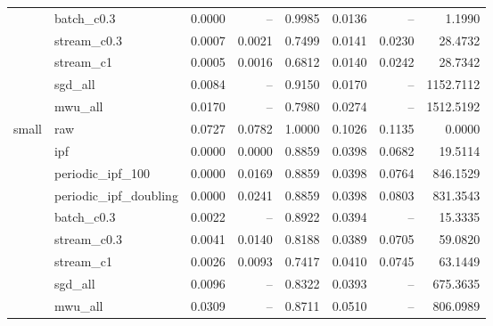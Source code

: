 \begin{tabular}{llrrrrrr}
 & batch\_c0.3 & 0.0000 & -- & 0.9985 & 0.0136 & -- & 1.1990 \\
 & stream\_c0.3 & 0.0007 & 0.0021 & 0.7499 & 0.0141 & 0.0230 & 28.4732 \\
 & stream\_c1 & 0.0005 & 0.0016 & 0.6812 & 0.0140 & 0.0242 & 28.7342 \\
 & sgd\_all & 0.0084 & -- & 0.9150 & 0.0170 & -- & 1152.7112 \\
 & mwu\_all & 0.0170 & -- & 0.7980 & 0.0274 & -- & 1512.5192 \\
\cline{1-8}
\multirow[t]{9}{*}{small} & raw & 0.0727 & 0.0782 & 1.0000 & 0.1026 & 0.1135 & 0.0000 \\
 & ipf & 0.0000 & 0.0000 & 0.8859 & 0.0398 & 0.0682 & 19.5114 \\
 & periodic\_ipf\_100 & 0.0000 & 0.0169 & 0.8859 & 0.0398 & 0.0764 & 846.1529 \\
 & periodic\_ipf\_doubling & 0.0000 & 0.0241 & 0.8859 & 0.0398 & 0.0803 & 831.3543 \\
 & batch\_c0.3 & 0.0022 & -- & 0.8922 & 0.0394 & -- & 15.3335 \\
 & stream\_c0.3 & 0.0041 & 0.0140 & 0.8188 & 0.0389 & 0.0705 & 59.0820 \\
 & stream\_c1 & 0.0026 & 0.0093 & 0.7417 & 0.0410 & 0.0745 & 63.1449 \\
 & sgd\_all & 0.0096 & -- & 0.8322 & 0.0393 & -- & 675.3635 \\
 & mwu\_all & 0.0309 & -- & 0.8711 & 0.0510 & -- & 806.0989 \\
\cline{1-8}
\bottomrule
\end{tabular}
